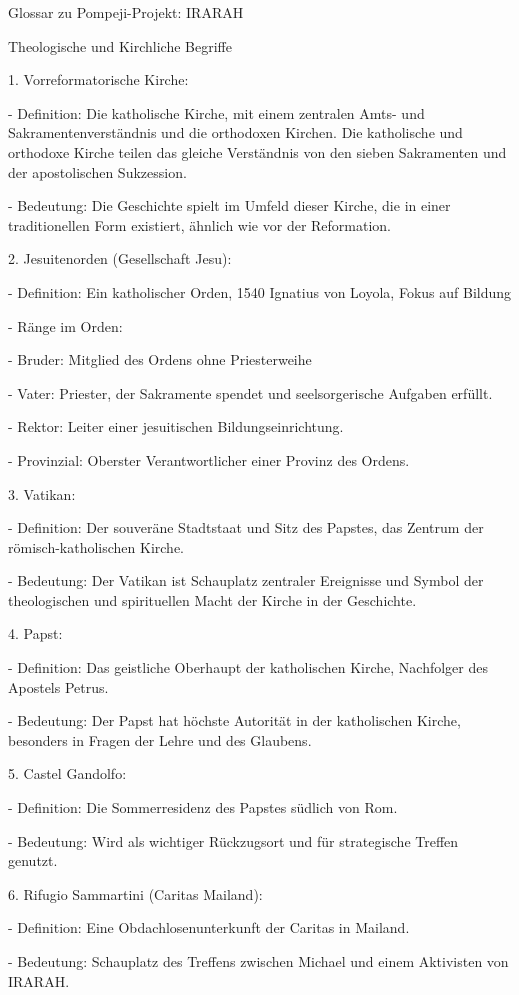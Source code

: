 \documentclass[
]{article}
\begin{document}
Glossar zu Pompeji-Projekt: IRARAH

Theologische und Kirchliche Begriffe

1. Vorreformatorische Kirche:

- Definition: Die katholische Kirche, mit einem zentralen Amts- und
Sakramentenverständnis und die orthodoxen Kirchen. Die katholische und
orthodoxe Kirche teilen das gleiche Verständnis von den sieben
Sakramenten und der apostolischen Sukzession.

- Bedeutung: Die Geschichte spielt im Umfeld dieser Kirche, die in einer
traditionellen Form existiert, ähnlich wie vor der Reformation.

2. Jesuitenorden (Gesellschaft Jesu):

- Definition: Ein katholischer Orden, 1540 Ignatius von Loyola, Fokus
auf Bildung

- Ränge im Orden:

- Bruder: Mitglied des Ordens ohne Priesterweihe

- Vater: Priester, der Sakramente spendet und seelsorgerische Aufgaben
erfüllt.

- Rektor: Leiter einer jesuitischen Bildungseinrichtung.

- Provinzial: Oberster Verantwortlicher einer Provinz des Ordens.

3. Vatikan:

- Definition: Der souveräne Stadtstaat und Sitz des Papstes, das Zentrum
der römisch-katholischen Kirche.

- Bedeutung: Der Vatikan ist Schauplatz zentraler Ereignisse und Symbol
der theologischen und spirituellen Macht der Kirche in der Geschichte.

4. Papst:

- Definition: Das geistliche Oberhaupt der katholischen Kirche,
Nachfolger des Apostels Petrus.

- Bedeutung: Der Papst hat höchste Autorität in der katholischen Kirche,
besonders in Fragen der Lehre und des Glaubens.

5. Castel Gandolfo:

- Definition: Die Sommerresidenz des Papstes südlich von Rom.

- Bedeutung: Wird als wichtiger Rückzugsort und für strategische Treffen
genutzt.

6. Rifugio Sammartini (Caritas Mailand):

- Definition: Eine Obdachlosenunterkunft der Caritas in Mailand.

- Bedeutung: Schauplatz des Treffens zwischen Michael und einem
Aktivisten von IRARAH.
\end{document}
